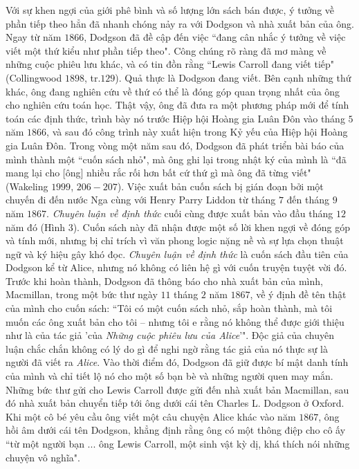 \begin{multicols}{2}
	\vskip 0.1cm
	Với sự khen ngợi của giới phê bình và số lượng lớn sách bán được, ý tưởng về phần tiếp theo hẳn đã nhanh chóng nảy ra với Dodgson và nhà xuất bản của ông. Ngay từ năm $1866$, Dodgson đã đề cập đến việc ``đang cân nhắc ý tưởng về việc viết một thứ kiểu như phần tiếp theo". Công chúng rõ ràng đã mơ màng về những cuộc phiêu lưu khác, và có tin đồn rằng ``Lewis Carroll đang viết tiếp" (Collingwood $1898$, tr.$129$).
	\vskip 0.1cm
	Quả thực là Dodgson đang viết. Bên cạnh những thứ khác, ông đang nghiên cứu về thứ có thể là đóng góp quan trọng nhất của ông cho nghiên cứu toán học. Thật vậy, ông đã đưa ra một phương pháp mới để tính toán các định thức, trình bày nó trước Hiệp hội Hoàng gia Luân Đôn vào tháng $5$ năm $1866$, và sau đó công trình này xuất hiện trong Kỷ yếu của Hiệp hội Hoàng gia Luân Đôn. Trong vòng một năm sau đó, Dodgson đã phát triển bài báo của mình thành một ``cuốn sách nhỏ", mà ông ghi lại trong nhật ký của mình là ``đã mang lại cho [ông] nhiều rắc rối hơn bất cứ thứ gì mà ông đã từng viết" (Wakeling $1999$, $206-207$). Việc xuất bản cuốn sách bị gián đoạn bởi một chuyến đi đến nước Nga cùng với Henry Parry Liddon từ tháng $7$ đến tháng $9$ năm $1867$. \textit{Chuyên luận về định thức} cuối cùng được xuất bản vào đầu tháng $12$ năm đó (Hình $3$). Cuốn sách này đã nhận được một số lời khen ngợi về đóng góp và tính mới, nhưng bị chỉ trích vì văn phong logic nặng nề và sự lựa chọn thuật ngữ và ký hiệu gây khó đọc.
	\vskip 0.1cm
	\textit{Chuyên luận về định thức} là cuốn sách đầu tiên của Dodgson kể từ Alice, nhưng nó không có liên hệ gì với cuốn truyện tuyệt vời đó. Trước khi hoàn thành, Dodgson đã thông báo cho nhà xuất bản của mình, Macmillan, trong một bức thư ngày $11$ tháng $2$ năm $1867$, về ý định đề tên thật của mình cho cuốn sách: ``Tôi có một cuốn sách nhỏ, sắp hoàn thành, mà tôi muốn các ông xuất bản cho tôi -- nhưng tôi e rằng nó không thể được giới thiệu như là của tác giả 'của \textit{Những cuộc phiêu lưu của Alice}'". Độc giả của chuyên luận chắc chắn không có lý do gì để nghi ngờ rằng tác giả của nó thực sự là người đã viết ra \textit{Alice}. Vào thời điểm đó, Dodgson đã giữ được bí mật danh tính của mình và chỉ tiết lộ nó cho một số bạn bè và những người quen may mắn. Những bức thư gửi cho Lewis Carroll được gửi đến nhà xuất bản Macmillan, sau đó nhà xuất bản chuyển tiếp tới ông dưới cái tên Charles L. Dodgson ở Oxford. Khi một cô bé yêu cầu ông viết một câu chuyện Alice khác vào năm $1867$, ông hồi âm dưới cái tên Dodgson, khẳng định rằng ông có một thông điệp cho cô ấy ``từ một người bạn ... ông Lewis Carroll, một sinh vật kỳ dị, khá thích nói những chuyện vô nghĩa".

\end{multicols}
